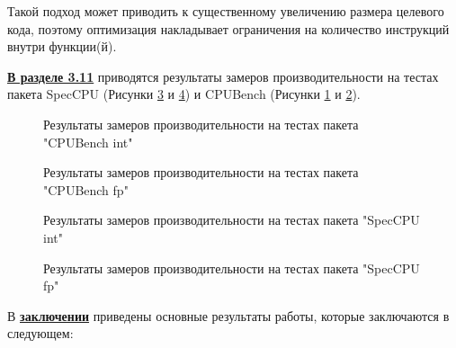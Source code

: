   Такой подход может приводить к существенному увеличению размера целевого кода, поэтому оптимизация накладывает ограничения на количество инструкций внутри функции(й).
  
  \underline{\textbf{В разделе 3.11}} приводятся результаты замеров производительности на тестах пакета SpecCPU (Рисунки \ref{fig:spec_int_speedup} и \ref{fig:spec_fp_speedup}) и CPUBench (Рисунки \ref{fig:spubench_int_speedup} и \ref{fig:spubench_fp_speedup}).
  
  \begin{figure}[ht]
  	\caption{Результаты замеров производительности на тестах  пакета "CPUBench int"\phantom{}}\label{fig:spubench_int_speedup}
  \end{figure}
    \begin{figure}[ht]
  	\caption{Результаты замеров производительности на тестах  пакета "CPUBench fp"\phantom{}}\label{fig:spubench_fp_speedup}
  \end{figure}
  
  \begin{figure}[ht]
  	\caption{Результаты замеров производительности на тестах  пакета "SpecCPU int"\phantom{}}\label{fig:spec_int_speedup}
  \end{figure}
    \begin{figure}[ht]
  	\caption{Результаты замеров производительности на тестах  пакета "SpecCPU fp"\phantom{}}\label{fig:spec_fp_speedup}
  \end{figure}
  

\FloatBarrier
{}                                  %
В \underline{\textbf{заключении}} приведены основные результаты работы, которые заключаются в следующем:

